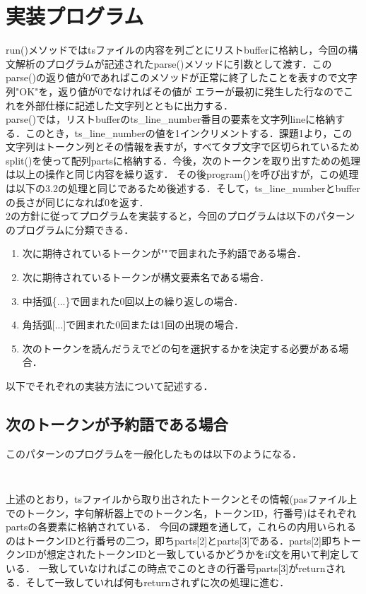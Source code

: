 \documentclass[dvipdfmx]{jarticle}
\begin{document}
\section{実装プログラム}
run()メソッドではtsファイルの内容を列ごとにリストbufferに格納し，今回の構文解析のプログラムが記述されたparse()メソッドに引数として渡す．このparse()の返り値が0であればこのメソッドが正常に終了したことを表すので文字列"OK"を，返り値が0でなければその値が
エラーが最初に発生した行なのでこれを外部仕様に記述した文字列とともに出力する．\\
parse()では，リストbufferのts\_line\_number番目の要素を文字列lineに格納する．このとき，ts\_line\_numberの値を1インクリメントする．課題1より，この文字列はトークン列とその情報を表すが，すべてタブ文字で区切られているため
split()を使って配列partsに格納する．今後，次のトークンを取り出すための処理は以上の操作と同じ内容を繰り返す．
その後program()を呼び出すが，この処理は以下の3.2の処理と同じであるため後述する．そして，ts\_line\_numberとbufferの長さが同じになれば0を返す．
\\2の方針に従ってプログラムを実装すると，今回のプログラムは以下のパターンのプログラムに分類できる．
\begin{enumerate}
  \item 次に期待されているトークンが""で囲まれた予約語である場合．
  \item 次に期待されているトークンが構文要素名である場合．
  \item 中括弧\{...\}で囲まれた0回以上の繰り返しの場合．
  \item 角括弧[...]で囲まれた0回または1回の出現の場合．
  \item 次のトークンを読んだうえでどの句を選択するかを決定する必要がある場合．
\end{enumerate}
以下でそれぞれの実装方法について記述する．
\subsection{次のトークンが予約語である場合}
このパターンのプログラムを一般化したものは以下のようになる．
\begin{lstlisting}
  
\end{lstlisting}
上述のとおり，tsファイルから取り出されたトークンとその情報(pasファイル上でのトークン，字句解析器上でのトークン名，トークンID，行番号)はそれぞれpartsの各要素に格納されている．
今回の課題を通して，これらの内用いられるのはトークンIDと行番号の二つ，即ちparts[2]とparts[3]である．parts[2]即ちトークンIDが想定されたトークンIDと一致しているかどうかをif文を用いて判定している．
一致していなければこの時点でこのときの行番号parts[3]がreturnされる．そして一致していれば何もreturnされずに次の処理に進む．
\end{document}
